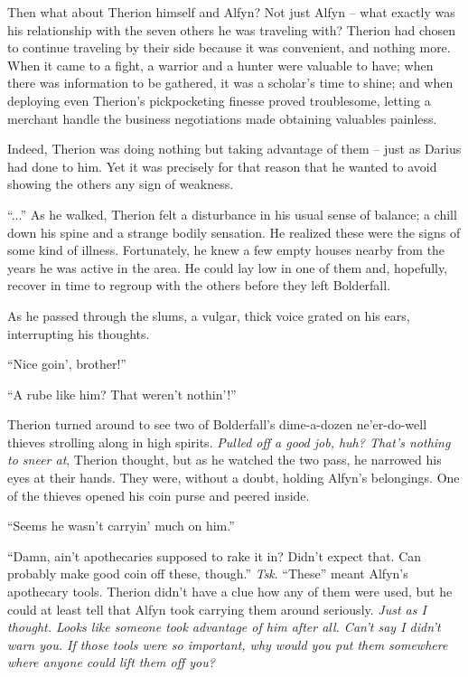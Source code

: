 Then what about Therion himself and Alfyn? Not just Alfyn -- what exactly was his relationship with the seven others he was traveling with? Therion had chosen to continue traveling by their side because it was convenient, and nothing more. When it came to a fight, a warrior and a hunter were valuable to have; when there was information to be gathered, it was a scholar's time to shine; and when deploying even Therion's pickpocketing finesse proved troublesome, letting a merchant handle the business negotiations made obtaining valuables painless. 

Indeed, Therion was doing nothing but taking advantage of them -- just as Darius had done to him. Yet it was precisely for that reason that he wanted to avoid showing the others any sign of weakness.

``...'' As he walked, Therion felt a disturbance in his usual sense of balance; a chill down his spine and a strange bodily sensation. He realized these were the signs of some kind of illness. Fortunately, he knew a few empty houses nearby from the years he was active in the area. He could lay low in one of them and, hopefully, recover in time to regroup with the others before they left Bolderfall.

As he passed through the slums, a vulgar, thick voice grated on his ears, interrupting his thoughts. 

``Nice goin', brother!''

``A rube like him? That weren't nothin'!'' 

Therion turned around to see two of Bolderfall's dime-a-dozen ne'er-do-well thieves strolling along in high spirits. \emph{Pulled off a good job, huh? That's nothing to sneer at}, Therion thought, but as he watched the two pass, he narrowed his eyes at their hands. They were, without a doubt, holding Alfyn's belongings. One of the thieves opened his coin purse and peered inside.

``Seems he wasn't carryin' much on him.''

``Damn, ain't apothecaries supposed to rake it in? Didn't expect that. Can probably make good coin off these, though.'' \emph{Tsk}. ``These'' meant Alfyn's apothecary tools. Therion didn't have a clue how any of them were used, but he could at least tell that Alfyn took carrying them around seriously. \emph{Just as I thought. Looks like someone took advantage of him after all. Can't say I didn't warn you. If those tools were so important, why would you put them somewhere where anyone could lift them off you?}

